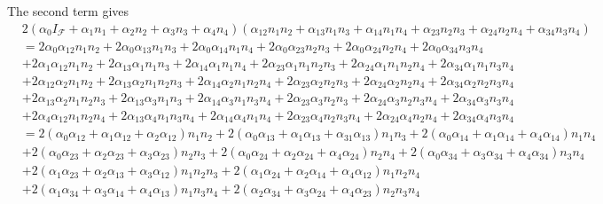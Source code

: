 \documentclass[aps,preprint]{revtex4}%
\begin{document}
The second term gives
\begin{align}
&  2\left(  \alpha_{0}I_{\mathcal{F}}+\alpha_{1}n_{1}+\alpha_{2}n_{2}%
+\alpha_{3}n_{3}+\alpha_{4}n_{4}\right)  \left(  \alpha_{12}n_{1}n_{2}%
+\alpha_{13}n_{1}n_{3}+\alpha_{14}n_{1}n_{4}+\alpha_{23}n_{2}n_{3}+\alpha
_{24}n_{2}n_{4}+\alpha_{34}n_{3}n_{4}\right) \nonumber\\
&  =2\alpha_{0}\alpha_{12}n_{1}n_{2}+2\alpha_{0}\alpha_{13}n_{1}n_{3}%
+2\alpha_{0}\alpha_{14}n_{1}n_{4}+2\alpha_{0}\alpha_{23}n_{2}n_{3}+2\alpha
_{0}\alpha_{24}n_{2}n_{4}+2\alpha_{0}\alpha_{34}n_{3}n_{4}\nonumber\\
&  +2\alpha_{1}\alpha_{12}n_{1}n_{2}+2\alpha_{13}\alpha_{1}n_{1}n_{3}%
+2\alpha_{14}\alpha_{1}n_{1}n_{4}+2\alpha_{23}\alpha_{1}n_{1}n_{2}%
n_{3}+2\alpha_{24}\alpha_{1}n_{1}n_{2}n_{4}+2\alpha_{34}\alpha_{1}n_{1}%
n_{3}n_{4}\nonumber\\
&  +2\alpha_{12}\alpha_{2}n_{1}n_{2}+2\alpha_{13}\alpha_{2}n_{1}n_{2}%
n_{3}+2\alpha_{14}\alpha_{2}n_{1}n_{2}n_{4}+2\alpha_{23}\alpha_{2}n_{2}%
n_{3}+2\alpha_{24}\alpha_{2}n_{2}n_{4}+2\alpha_{34}\alpha_{2}n_{2}n_{3}%
n_{4}\nonumber\\
&  +2\alpha_{13}\alpha_{2}n_{1}n_{2}n_{3}+2\alpha_{13}\alpha_{3}n_{1}%
n_{3}+2\alpha_{14}\alpha_{3}n_{1}n_{3}n_{4}+2\alpha_{23}\alpha_{3}n_{2}%
n_{3}+2\alpha_{24}\alpha_{3}n_{2}n_{3}n_{4}+2\alpha_{34}\alpha_{3}n_{3}%
n_{4}\nonumber\\
&  +2\alpha_{4}\alpha_{12}n_{1}n_{2}n_{4}+2\alpha_{13}\alpha_{4}n_{1}%
n_{3}n_{4}+2\alpha_{14}\alpha_{4}n_{1}n_{4}+2\alpha_{23}\alpha_{4}n_{2}%
n_{3}n_{4}+2\alpha_{24}\alpha_{4}n_{2}n_{4}+2\alpha_{34}\alpha_{4}n_{3}%
n_{4}\nonumber\\
&  =2\left(  \alpha_{0}\alpha_{12}+\alpha_{1}\alpha_{12}+\alpha_{2}\alpha
_{12}\right)  n_{1}n_{2}+2\left(  \alpha_{0}\alpha_{13}+\alpha_{1}\alpha
_{13}+\alpha_{31}\alpha_{13}\right)  n_{1}n_{3}+2\left(  \alpha_{0}\alpha
_{14}+\alpha_{1}\alpha_{14}+\alpha_{4}\alpha_{14}\right)  n_{1}n_{4}%
\nonumber\\
&  +2\left(  \alpha_{0}\alpha_{23}+\alpha_{2}\alpha_{23}+\alpha_{3}\alpha
_{23}\right)  n_{2}n_{3}+2\left(  \alpha_{0}\alpha_{24}+\alpha_{2}\alpha
_{24}+\alpha_{4}\alpha_{24}\right)  n_{2}n_{4}+2\left(  \alpha_{0}\alpha
_{34}+\alpha_{3}\alpha_{34}+\alpha_{4}\alpha_{34}\right)  n_{3}n_{4}%
\nonumber\\
&  +2\left(  \alpha_{1}\alpha_{23}+\alpha_{2}\alpha_{13}+\alpha_{3}\alpha
_{12}\right)  n_{1}n_{2}n_{3}+2\left(  \alpha_{1}\alpha_{24}+\alpha_{2}%
\alpha_{14}+\alpha_{4}\alpha_{12}\right)  n_{1}n_{2}n_{4}\nonumber\\
&  +2\left(  \alpha_{1}\alpha_{34}+\alpha_{3}\alpha_{14}+\alpha_{4}\alpha
_{13}\right)  n_{1}n_{3}n_{4}+2\left(  \alpha_{2}\alpha_{34}+\alpha_{3}%
\alpha_{24}+\alpha_{4}\alpha_{23}\right)  n_{2}n_{3}n_{4}%
\end{align}
\end{document}

